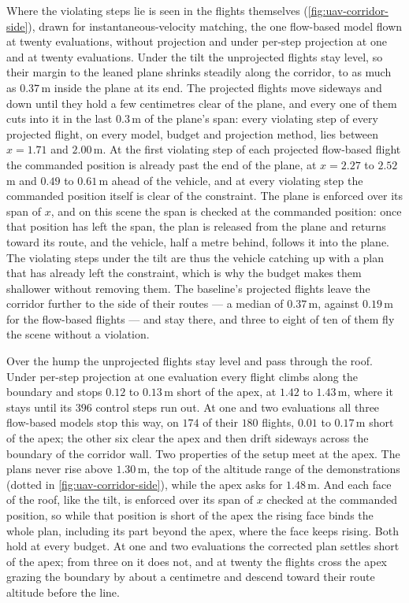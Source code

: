 Where the violating steps lie is seen in the flights themselves (\autoref{fig:uav-corridor-side}), drawn
for instantaneous-velocity matching, the one flow-based model flown at twenty evaluations, without
projection and under per-step projection at one and at twenty evaluations. Under the tilt the unprojected
flights stay level, so their margin to the leaned plane shrinks steadily along the corridor, to as much
as $0.37$\,m inside the plane at its end. The projected flights move sideways and down until they hold a few
centimetres clear of the plane, and every one of them cuts into it in the last $0.3$\,m of the plane's
span: every violating step of every projected flight, on every model, budget and projection method, lies
between $x=1.71$ and $2.00$\,m. At the first violating step of each projected flow-based flight the
commanded position is already past the end of the plane, at $x=2.27$ to $2.52$\,m and $0.49$ to
$0.61$\,m ahead of the vehicle, and at every violating step the commanded position itself is clear of the
constraint. The plane is enforced over its span of $x$, and on this scene the span is checked at the
commanded position: once that position has left the span, the plan is released from the plane and
returns toward its route, and the vehicle, half a metre behind, follows it into the plane. The violating
steps under the tilt are thus the vehicle catching up with a plan that has already left the constraint,
which is why the budget makes them shallower without removing them. The baseline's projected flights leave
the corridor further to the side of their routes --- a median of $0.37$\,m, against $0.19$\,m for the
flow-based flights --- and stay there, and three to eight of ten of them fly the scene without a
violation.

Over the hump the unprojected flights stay level and pass through the roof. Under per-step projection at one
evaluation every flight climbs along the boundary and stops $0.12$ to $0.13$\,m short of the apex, at
$1.42$ to $1.43$\,m, where it stays until its $396$ control steps run out. At one and two evaluations
all three flow-based models stop this way, on $174$ of their $180$ flights, $0.01$ to $0.17$\,m short of
the apex; the other six clear the apex and then drift sideways across the boundary of the corridor wall.
Two properties of the setup meet at the apex. The plans never rise above $1.30$\,m, the top of the
altitude range of the demonstrations (dotted in \autoref{fig:uav-corridor-side}), while the apex asks for
$1.48$\,m. And each face of the roof, like the tilt, is enforced over its span of $x$ checked at the
commanded position, so while that position is short of the apex the rising face binds the whole plan,
including its part beyond the apex, where the face keeps rising. Both hold at every budget. At one and
two evaluations the corrected plan settles short of the apex; from three on it does not, and at twenty
the flights cross the apex grazing the boundary by about a centimetre and descend toward their route
altitude before the line.

